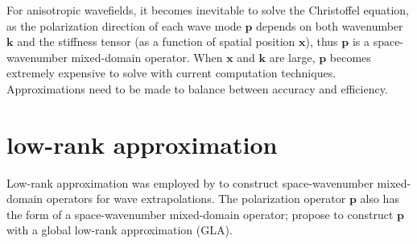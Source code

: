 \documentclass[manuscript,ulem,graphix,revised]{geophysics}
\begin{document}
For anisotropic wavefields, it becomes inevitable to solve the Christoffel equation, as the polarization direction of each wave mode \marginnote{[11]}\uline{$\boldsymbol{p}$} depends on both wavenumber \uline{$\boldsymbol{k}$} and the stiffness tensor (as a function of spatial position \marginnote{[11]}\uline{$\boldsymbol{x}$}),
thus \marginnote{[11]} \uline{$\boldsymbol{p}$} is a space-wavenumber mixed-domain operator. When \marginnote{[11]} \uline{$\boldsymbol{x}$} and \uline{$\boldsymbol{k}$} are large, \uline{$\boldsymbol{p}$} becomes extremely expensive to solve with current computation techniques. Approximations need to be made to balance between accuracy and efficiency.


\section{low-rank approximation}
\indent\indent
Low-rank approximation was  employed by \citet{fomel13} to construct space-wavenumber mixed-domain operators for wave extrapolations. The polarization operator \marginnote{[11]}\uline{$\boldsymbol{p}$} also has the form of a space-wavenumber mixed-domain operator; \citet{cheng14} propose to construct \marginnote{[11]}\uline{$\boldsymbol{p}$} with a global low-rank approximation (GLA).
\end{document}

